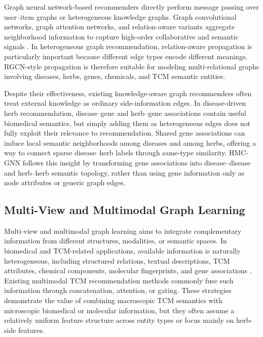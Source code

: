 \documentclass[journal,twoside,web]{ieeecolor}
\begin{document}
Graph neural network-based recommenders directly perform message passing over user--item graphs or heterogeneous knowledge graphs. Graph convolutional networks, graph attention networks, and relation-aware variants aggregate neighborhood information to capture high-order collaborative and semantic signals \cite{ref35,ref43,ref44}. In heterogeneous graph recommendation, relation-aware propagation is particularly important because different edge types encode different meanings. RGCN-style propagation is therefore suitable for modeling multi-relational graphs involving diseases, herbs, genes, chemicals, and TCM semantic entities.

Despite their effectiveness, existing knowledge-aware graph recommenders often treat external knowledge as ordinary side-information edges. In disease-driven herb recommendation, disease--gene and herb--gene associations contain useful biomedical semantics, but simply adding them as heterogeneous edges does not fully exploit their relevance to recommendation. Shared gene associations can induce local semantic neighborhoods among diseases and among herbs, offering a way to connect sparse disease--herb labels through same-type similarity. HMC-GNN follows this insight by transforming gene associations into disease--disease and herb--herb semantic topology, rather than using gene information only as node attributes or generic graph edges.

\subsection{Multi-View and Multimodal Graph Learning}

Multi-view and multimodal graph learning aims to integrate complementary information from different structures, modalities, or semantic spaces. In biomedical and TCM-related applications, available information is naturally heterogeneous, including structured relations, textual descriptions, TCM attributes, chemical components, molecular fingerprints, and gene associations \cite{ref45,ref46,ref47,ref48,ref49,ref50}. Existing multimodal TCM recommendation methods commonly fuse such information through concatenation, attention, or gating. These strategies demonstrate the value of combining macroscopic TCM semantics with microscopic biomedical or molecular information, but they often assume a relatively uniform feature structure across entity types or focus mainly on herb-side features.
\end{document}
